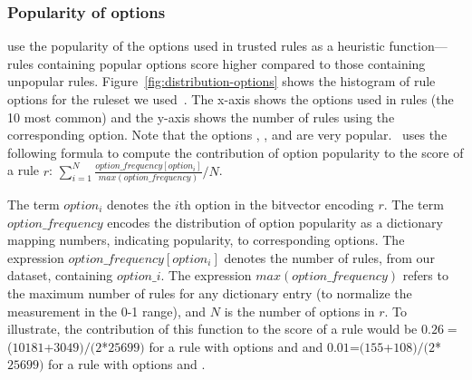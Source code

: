 \documentclass[conference]{IEEEtran}
\begin{document}


\subsubsection{\label{sec:popularity-options}Popularity of options}

\tname{} use the popularity of the options used in trusted rules as a
heuristic function---rules containing popular options score higher
compared to those containing unpopular
rules. Figure~\ref{fig:distribution-options} shows the histogram of
rule options for the ruleset we used~\cite{emerging-threats-open}. The
x-axis shows the options used in rules (the 10 most common) and the
y-axis shows the number of rules using the corresponding option. Note
that the options , , and 
are very popular. \tname\ uses the following formula to compute the
contribution of option popularity to the score of a rule $r$:
\indent
$\sum_{i=1}^{N}\frac{\mathit{option\_frequency[option_i]}}{\mathit{max(option\_frequency)}}/N$.




\noindent
The term $\mathit{option_i}$ denotes the $i$th option in the bitvector
encoding $r$. The term $\mathit{option\_frequency}$ encodes the
distribution of option popularity as a dictionary mapping numbers,
indicating popularity, to corresponding options. The expression
$\mathit{option\_frequency[option_i]}$ denotes the number of rules,
from our dataset, containing $\mathit{option\_i}$. The expression
$\mathit{max(option\_frequency)}$ refers to the maximum number of
rules for any dictionary entry (to normalize the measurement in the
0-1 range), and $N$ is the number of options in $r$. To illustrate,
the contribution of this function to the score of a rule would be
$0.26=$($10181$+$3049)/(2$*$25699)$ for a rule with options
 and  and
$0.01$=$(155$+$108)/(2$*$25699)$ for a rule with options
 and .
\end{document}

